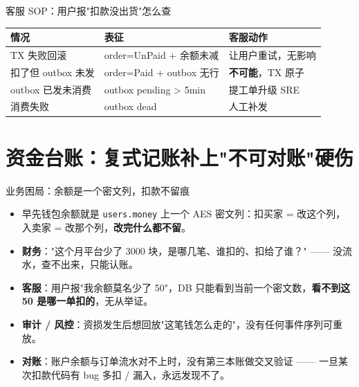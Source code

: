 \documentclass[aspectratio=169,11pt]{beamer}
\begin{document}
\begin{frame}[shrink]{客服 SOP：用户报"扣款没出货"怎么查}
\vspace{1mm}
\small
\begin{tabular}{@{}lll@{}}
\toprule
情况 & 表征 & 客服动作 \\
\midrule
TX 失败回滚 & order=UnPaid + 余额未减 & 让用户重试，无影响 \\
扣了但 outbox 未发 & order=Paid + outbox 无行 & \textbf{不可能}，TX 原子 \\
outbox 已发未消费 & outbox pending > 5min & 提工单升级 SRE \\
消费失败 & outbox dead & 人工补发 \\
\bottomrule
\end{tabular}
\end{frame}

\section{资金台账：复式记账补上"不可对账"硬伤}

\begin{frame}[shrink]{业务困局：余额是一个密文列，扣款不留痕}
\begin{itemize}
  \item 早先钱包余额就是 \texttt{users.money} 上一个 AES 密文列：扣买家 = 改这个列，入卖家 = 改那个列，\textbf{改完什么都不留}。
  \item \textbf{财务}："这个月平台少了 3000 块，是哪几笔、谁扣的、扣给了谁？" —— 没流水，查不出来，只能认账。
  \item \textbf{客服}：用户报"我余额莫名少了 50"，DB 只能看到当前一个密文数，\textbf{看不到这 50 是哪一单扣的}，无从举证。
  \item \textbf{审计 / 风控}：资损发生后想回放"这笔钱怎么走的"，没有任何事件序列可重放。
  \item \textbf{对账}：账户余额与订单流水对不上时，没有第三本账做交叉验证 —— 一旦某次扣款代码有 bug 多扣 / 漏入，永远发现不了。
\end{itemize}
\end{frame}
\end{document}
